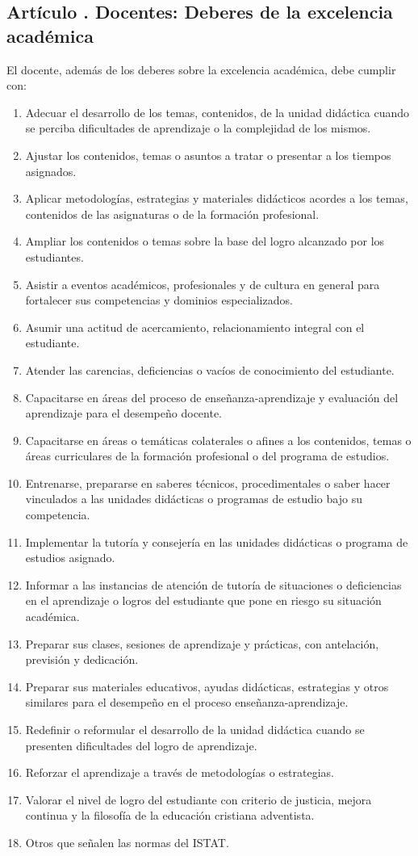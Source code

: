 \subsection{Artículo . Docentes: Deberes de la excelencia académica}
\addtocounter{ns}{1}
El docente, además de los deberes sobre la excelencia académica, debe cumplir con: 
\begin{enumerate}
\item Adecuar el desarrollo de los temas, contenidos, de la unidad didáctica cuando se perciba dificultades de aprendizaje o la complejidad de los mismos. 
\item Ajustar los contenidos, temas o asuntos a tratar o presentar a los tiempos asignados. 
\item Aplicar metodologías, estrategias y materiales didácticos acordes a los temas, contenidos de las asignaturas o de la formación profesional. 
\item Ampliar los contenidos o temas sobre la base del logro alcanzado por los estudiantes. 
\item Asistir a eventos académicos, profesionales y de cultura en general para fortalecer sus competencias y dominios especializados. 
\item Asumir una actitud de acercamiento, relacionamiento integral con el estudiante. 
\item Atender las carencias, deficiencias o vacíos de conocimiento del estudiante. 
\item Capacitarse en áreas del proceso de enseñanza-aprendizaje y evaluación del aprendizaje para el desempeño docente. 
\item Capacitarse en áreas o temáticas colaterales o afines a los contenidos, temas o áreas curriculares de la formación profesional o del programa de estudios. 
\item Entrenarse, prepararse en saberes técnicos, procedimentales o saber hacer vinculados a las unidades didácticas o programas de estudio bajo su competencia. 
\item Implementar la tutoría y consejería en las unidades didácticas o programa de estudios asignado. 
\item Informar a las instancias de atención de tutoría de situaciones o deficiencias en el aprendizaje o logros del estudiante que pone en riesgo su situación académica. 
\item Preparar sus clases, sesiones de aprendizaje y prácticas, con antelación, previsión y dedicación. 
\item Preparar sus materiales educativos, ayudas didácticas, estrategias y otros similares para el desempeño en el proceso enseñanza-aprendizaje. 
\item Redefinir o reformular el desarrollo de la unidad didáctica cuando se presenten dificultades del logro de aprendizaje. 
\item Reforzar el aprendizaje a través de metodologías o estrategias. 
\item Valorar el nivel de logro del estudiante con criterio de justicia, mejora continua y la filosofía de la educación cristiana adventista. 
\item Otros que señalen las normas del ISTAT. 
\end{enumerate}
